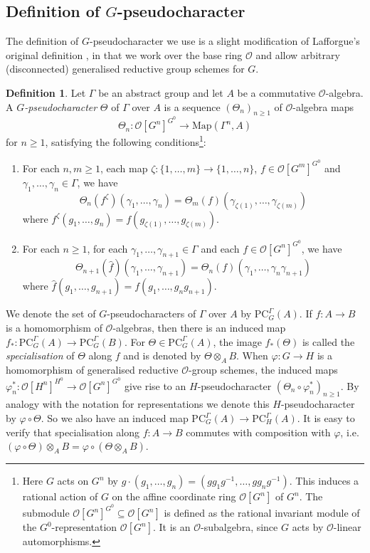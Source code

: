 \documentclass{amsart}
\theoremstyle{definition}
\newtheorem{defi}[prop]{Definition}
\theoremstyle{remark}
\newcommand{\OO}{\mathcal O}
\newcommand{\PC}{\mathrm{PC}}
\begin{document}
\subsection{\texorpdfstring{Definition of $G$-pseudocharacter}{Definition of G-pseudocharacter}} The definition of $G$-pseudocharacter we use is a slight modification of Lafforgue’s original
definition \cite[Section 11]{Laf}, in that we work over the base ring $\OO$ and allow arbitrary (disconnected) generalised reductive group schemes for $G$.

\begin{defi}\label{LafPC} Let $\Gamma$ be an abstract group and let $A$ be a commutative $\OO$-algebra. A \emph{$G$-pseudocharacter} $\Theta$ of $\Gamma$ over $A$ is a sequence $(\Theta_n)_{n \geq 1}$ of $\OO$-algebra maps
$$\Theta_n : \OO[G^n]^{G^0} \to \mathrm{Map}(\Gamma^n,A)$$ for $n \geq 1$, satisfying the following conditions\footnote{Here $G$ acts on $G^n$ by $g \cdot (g_1, \dots, g_n) = (gg_1g^{-1}, \dots, gg_ng^{-1})$. This induces a rational action of $G$ on the affine coordinate ring $\OO[G^n]$ of $G^n$. The submodule $\OO[G^n]^{G^0} \subseteq \OO[G^n]$ is defined as the rational invariant module of the $G^0$-representation $\OO[G^n]$. It is an $\OO$-subalgebra, since $G$ acts by $\OO$-linear automorphisms.}:
\begin{enumerate}
    \item For each $n,m \geq 1$, each map $\zeta : \{1, \dots, m\} \to \{1, \dots,n\}$, $f \in \OO[G^m]^{G^0}$ and $\gamma_1, \dots, \gamma_n \in \Gamma$, we have
    $$ \Theta_n(f^{\zeta})(\gamma_1, \dots, \gamma_n) = \Theta_m(f)(\gamma_{\zeta(1)}, \dots, \gamma_{\zeta(m)}) $$
    where $f^{\zeta}(g_1, \dots, g_n) = f(g_{\zeta(1)}, \dots, g_{\zeta(m)})$.
    \item For each $n \geq 1$, for each $\gamma_1, \dots, \gamma_{n+1} \in \Gamma$ and each $f \in \OO[G^n]^{G^0}$, we have
    $$ \Theta_{n+1}(\hat f)(\gamma_1, \dots, \gamma_{n+1}) = \Theta_n(f)(\gamma_1, \dots, \gamma_n\gamma_{n+1}) $$
    where $\hat f(g_1, \dots, g_{n+1}) = f(g_1, \dots, g_ng_{n+1})$.
\end{enumerate}
\end{defi}
We denote the set of $G$-pseudocharacters of $\Gamma$ over $A$ by $\PC_G^{\Gamma}(A)$.
If $f : A \to B$ is a homomorphism of $\OO$-algebras, then there is an induced map $f_* : \mathrm{PC}_{G}^{\Gamma}(A) \to \mathrm{PC}_{G}^{\Gamma}(B)$.
For $\Theta \in \mathrm{PC}_{G}^{\Gamma}(A)$, the image $f_*(\Theta)$ is called the \emph{specialisation} of $\Theta$ along $f$ and is denoted by $\Theta \otimes_A B$. When $\varphi : G \to H$ is a homomorphism of generalised reductive $\OO$-group schemes, the induced maps $\varphi^*_n : \OO[H^n]^{H^0} \to \OO[G^n]^{G^0}$ give rise to an $H$-pseudocharacter $(\Theta_n \circ \varphi^*_n)_{n \geq 1}$. By analogy with the notation for representations we denote this $H$-pseudocharacter by $\varphi \circ \Theta$. So we also have an induced map $\PC_G^{\Gamma}(A) \to \PC_H^{\Gamma}(A)$.
It is easy to verify that specialisation along $f : A \to B$ commutes with composition with $\varphi$, i.e. $(\varphi \circ \Theta) \otimes_A B = \varphi \circ (\Theta \otimes_A B)$.
\end{document}
